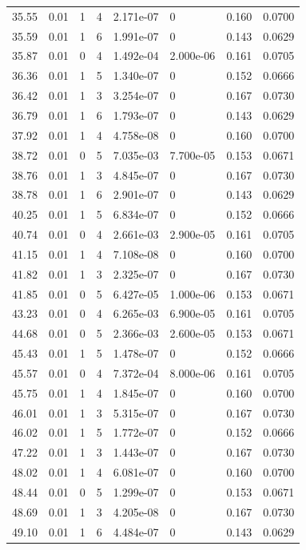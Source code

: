 \documentclass[preview]{standalone}
\begin{document}
{{{\begin{tabular}{L{1.2cm}C{1.2cm} C{0.3cm}C{0.5cm} C{1.4cm}C{1.4cm} C{1.4cm}C{1.4cm}}
  35.55  &  0.01  & 1     &  4 &  2.171e-07  & 0  & 0.160 &  0.0700   \\ 
  35.59  &  0.01  & 1     &  6 &  1.991e-07  & 0  & 0.143 &  0.0629   \\ 
  35.87  &  0.01  & 0     &  4 &  1.492e-04  & 2.000e-06  & 0.161 &  0.0705   \\ 
  36.36  &  0.01  & 1     &  5 &  1.340e-07  & 0  & 0.152 &  0.0666   \\ 
  36.42  &  0.01  & 1     &  3 &  3.254e-07  & 0  & 0.167 &  0.0730   \\ 
  36.79  &  0.01  & 1     &  6 &  1.793e-07  & 0  & 0.143 &  0.0629   \\ 
  37.92  &  0.01  & 1     &  4 &  4.758e-08  & 0  & 0.160 &  0.0700   \\ 
  38.72  &  0.01  & 0     &  5 &  7.035e-03  & 7.700e-05  & 0.153 &  0.0671   \\ 
  38.76  &  0.01  & 1     &  3 &  4.845e-07  & 0  & 0.167 &  0.0730   \\ 
  38.78  &  0.01  & 1     &  6 &  2.901e-07  & 0  & 0.143 &  0.0629   \\ 
  40.25  &  0.01  & 1     &  5 &  6.834e-07  & 0  & 0.152 &  0.0666   \\ 
  40.74  &  0.01  & 0     &  4 &  2.661e-03  & 2.900e-05  & 0.161 &  0.0705   \\ 
  41.15  &  0.01  & 1     &  4 &  7.108e-08  & 0  & 0.160 &  0.0700   \\ 
  41.82  &  0.01  & 1     &  3 &  2.325e-07  & 0  & 0.167 &  0.0730   \\ 
  41.85  &  0.01  & 0     &  5 &  6.427e-05  & 1.000e-06  & 0.153 &  0.0671   \\ 
  43.23  &  0.01  & 0     &  4 &  6.265e-03  & 6.900e-05  & 0.161 &  0.0705   \\ 
  44.68  &  0.01  & 0     &  5 &  2.366e-03  & 2.600e-05  & 0.153 &  0.0671   \\ 
  45.43  &  0.01  & 1     &  5 &  1.478e-07  & 0  & 0.152 &  0.0666   \\ 
  45.57  &  0.01  & 0     &  4 &  7.372e-04  & 8.000e-06  & 0.161 &  0.0705   \\ 
  45.75  &  0.01  & 1     &  4 &  1.845e-07  & 0  & 0.160 &  0.0700   \\ 
  46.01  &  0.01  & 1     &  3 &  5.315e-07  & 0  & 0.167 &  0.0730   \\ 
  46.02  &  0.01  & 1     &  5 &  1.772e-07  & 0  & 0.152 &  0.0666   \\ 
  47.22  &  0.01  & 1     &  3 &  1.443e-07  & 0  & 0.167 &  0.0730   \\ 
  48.02  &  0.01  & 1     &  4 &  6.081e-07  & 0  & 0.160 &  0.0700   \\ 
  48.44  &  0.01  & 0     &  5 &  1.299e-07  & 0  & 0.153 &  0.0671   \\ 
  48.69  &  0.01  & 1     &  3 &  4.205e-08  & 0  & 0.167 &  0.0730   \\ 
  49.10  &  0.01  & 1     &  6 &  4.484e-07  & 0  & 0.143 &  0.0629   \\ 
\hline 
\end{tabular} 

}}}
\end{document}
